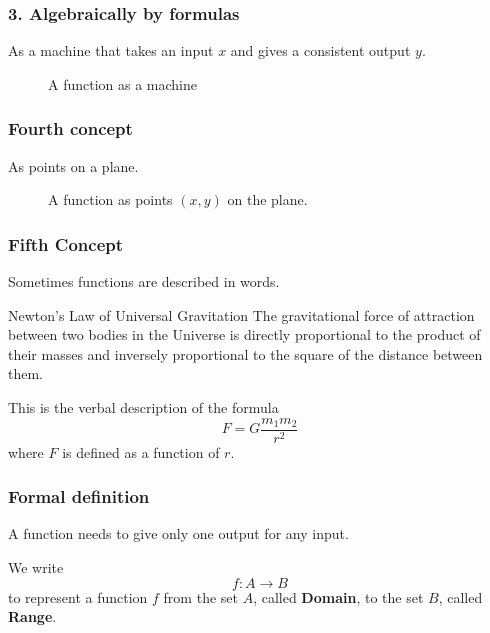 \begin{frame}
\frametitle{3. Algebraically by formulas}
As a machine that takes an input $x$ and gives a consistent output $y$.
\begin{figure}[h!]
\centering
{}
\caption{A function as a machine}
\end{figure}
\end{frame}

\begin{frame}
\frametitle{Fourth concept}
As points on a plane.
\end{frame}

\begin{frame}
\begin{figure}[h!]
\centering
{}
\caption{A function as points $(x,y)$ on the plane.}
\end{figure}
\end{frame}

\begin{frame}
\frametitle{Fifth Concept}
Sometimes functions are described in words.
\begin{remark}{Newton's Law of Universal Gravitation}
The gravitational force of attraction between two bodies in the Universe is directly proportional to the product of their masses and inversely proportional to the square of the distance between them.
\end{remark}
This is the verbal description of the formula
\[F = G \frac{m_1 m_2}{r^2}\]
where $F$ is defined as a function of $r$.
\end{frame}


\begin{frame}
\frametitle{Formal definition}
\begin{defn}{}{}
A function needs to give only one output for any input.
\medskip

We write 
\[ f: A \rightarrow B\] 
to represent a function $f$ from the set $A$, called \textbf{Domain}, to the set $B$, called \textbf{Range}.
\end{defn} \pause
\end{frame}

